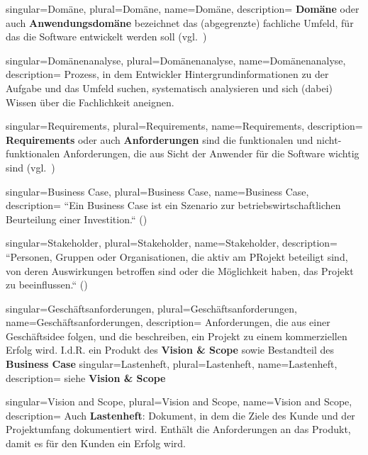 {
singular={Domäne},
plural={Domäne},
name={Domäne},
description={
\textbf{Domäne} oder auch \textbf{Anwendungsdomäne} bezeichnet das (abgegrenzte) fachliche Umfeld, für das die Software entwickelt werden soll (vgl.~\cite[41]{Wed09})
}
}

{
singular={Domänenanalyse},
plural={Domänenanalyse},
name={Domänenanalyse},
description={
Prozess, in dem Entwickler Hintergrundinformationen zu der Aufgabe und das Umfeld suchen, systematisch analysieren und sich (dabei) Wissen über die Fachlichkeit aneignen.
}
}


{
singular={Requirements},
plural={Requirements},
name={Requirements},
description={
\textbf{Requirements} oder auch \textbf{Anforderungen} sind die funktionalen und nicht-funktionalen Anforderungen, die aus Sicht der Anwender für die Software wichtig sind  (vgl.~\cite[41]{Wed09})
}
}

{
singular={Business Case},
plural={Business Case},
name={Business Case},
description={
``Ein Business Case ist ein Szenario zur betriebswirtschaftlichen Beurteilung einer Investition.`` (\cite[11]{Brug09})
}
}

{
singular={Stakeholder},
plural={Stakeholder},
name={Stakeholder},
description={
``Personen, Gruppen oder Organisationen, die aktiv am PRojekt beteiligt sind, von deren Auswirkungen betroffen sind oder die Möglichkeit haben, das Projekt zu beeinflussen.`` (\cite[49]{Wed09})
}
}


{
singular={Geschäftsanforderungen},
plural={Geschäftsanforderungen},
name={Geschäftsanforderungen},
description={
Anforderungen, die aus einer Geschäftsidee folgen, und die beschreiben, ein Projekt zu einem kommerziellen Erfolg wird. I.d.R. ein Produkt des \textbf{Vision \& Scope} sowie Bestandteil des \textbf{Business Case}
}
}
{
singular={Lastenheft},
plural={Lastenheft},
name={Lastenheft},
description={
siehe \textbf{Vision \& Scope}
}
}


{
singular={Vision and Scope},
plural={Vision and Scope},
name={Vision and Scope},
description={
Auch \textbf{Lastenheft}: Dokument, in dem die Ziele des Kunde und der Projektumfang dokumentiert wird. Enthält die Anforderungen an das Produkt, damit es für den Kunden ein Erfolg wird.
}
}
